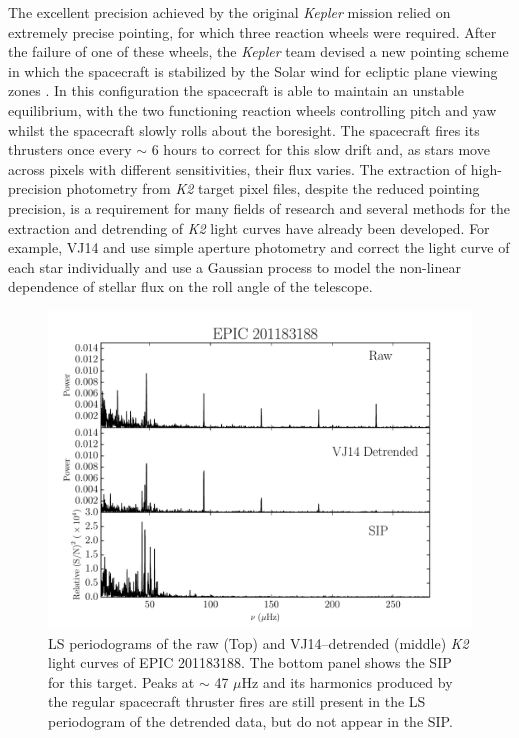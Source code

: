 The excellent precision achieved by the original {\it Kepler} mission relied
on extremely precise pointing, for which three reaction wheels were required.
After the failure of one of these wheels, the {\it Kepler} team devised a new
pointing scheme in which the spacecraft is stabilized by the Solar wind for
ecliptic plane viewing zones \citep{Howell2014}.
In this configuration the spacecraft is able to maintain an unstable
equilibrium, with the two functioning reaction wheels controlling pitch and
yaw whilst the spacecraft slowly rolls about the boresight.
The spacecraft fires its thrusters once every $\sim$ 6 hours
\citep[][hereafter VJ14]{Vanderburg2014} to correct for
this slow drift and, as stars move across pixels with different sensitivities,
their flux varies.
The extraction of high-precision photometry from {\it K2} target pixel files,
despite the reduced pointing precision, is a requirement for many fields of
research and several methods for the extraction and detrending of {\it K2}
light curves have already been developed.
For example, VJ14 and \citet{Crossfield2015}
use simple aperture photometry and correct the light curve of each star
individually and \citet{Aigrain2015} use a Gaussian process to model the
non-linear dependence of stellar flux on the roll angle of the telescope.

\begin{figure}[p]
\begin{center}
\includegraphics[width=6in, clip=true]{figures/rawvbg_201183188.pdf}
\caption[Comparing the SIP to a detrended LS periodogram.]
{LS periodograms of the raw (Top) and VJ14--detrended (middle) {\it K2}
	 light curves of EPIC 201183188.
	 The bottom panel shows the SIP for this target.
	 Peaks at $\sim$ 47 $\mu$Hz and its harmonics produced by the regular
	 spacecraft thruster fires are still present in the LS periodogram of
	 the detrended data, but do not appear in the SIP.}
\label{fig:raw}
\end{center}
\end{figure}

